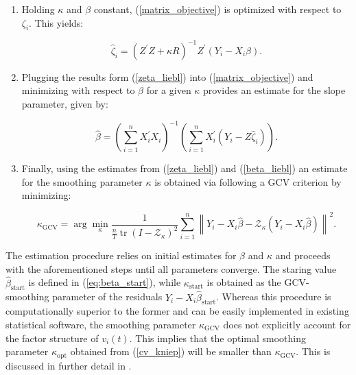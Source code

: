 \begin{enumerate}
    \item Holding $\kappa$ and $\beta$ constant, (\ref{matrix_objective}) is optimized with respect to $\zeta_i$. This yields:

    \begin{equation}\label{zeta_liebl}
        \hat{\zeta}_i=\left(Z^{\prime} Z+\kappa R\right)^{-1} Z^{\prime}\left(Y_i-X_i \beta\right) .
    \end{equation}
    \item Plugging the results form (\ref{zeta_liebl}) into (\ref{matrix_objective}) and minimizing with respect to $\beta$ for a given $\kappa$ provides an estimate for the slope parameter, given by:

    \begin{equation}\label{beta_liebl}
        \hat{\beta}=\left(\sum_{i=1}^n X_i^{\prime} X_i\right)^{-1}\left(\sum_{i=1}^n X_i^{\prime}\left(Y_i-Z \hat{\zeta}_i\right)\right) .
    \end{equation}
    \item Finally, using the estimates from (\ref{zeta_liebl}) and (\ref{beta_liebl}) an estimate for the smoothing parameter $\kappa$ is obtained via following a \ac{GCV} criterion by minimizing:

    \begin{equation}\label{liebl_algo}
        \kappa_{\text{GCV}}=\arg \min _\kappa \frac{1}{\frac{n}{T} \operatorname{tr}\left(I-\mathcal{Z}_\kappa\right)^2} \sum_{i=1}^n\left\|Y_i-X_i \hat{\beta}-\mathcal{Z}_\kappa\left(Y_i-X_i \hat{\beta}\right)\right\|^2 .
    \end{equation}
    
\end{enumerate}
The estimation procedure relies on initial estimates for $\beta$ and $\kappa$ and proceeds with the aforementioned steps until all parameters converge. The staring value $\hat{\beta}_{\text{start}}$ is defined in (\ref{eq:beta_start}), while $\kappa_{\text{start}}$ is obtained as the \ac{GCV}-smoothing parameter of the residuals $Y_i - X_i\hat{\beta}_{\text{start}} $. Whereas this procedure is computationally superior to the former and can be easily implemented in existing statistical software, the smoothing parameter $\kappa_{\text{GCV}}$ does not explicitly account for the factor structure of $v_i(t)$. This implies that the optimal smoothing parameter $\kappa_{\text{opt}}$ obtained from (\ref{cv_kniep}) will be smaller than $ \kappa_{\text{GCV}}$. This is discussed in further detail in \citet{bada2012phtt}.
 
